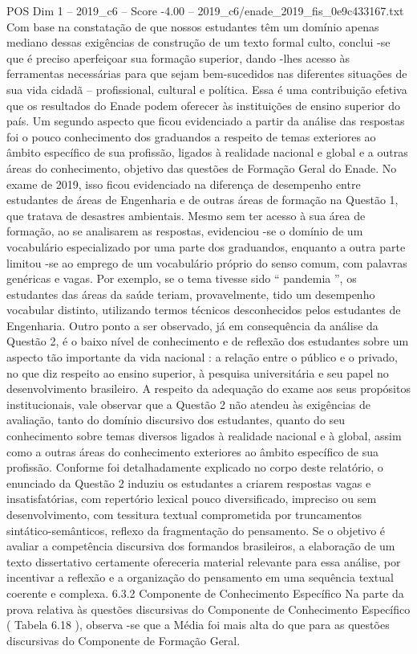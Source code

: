 \begin{textsample}{POS Dim 1 – 2019\_c6 – Score -4.00 – 2019\_c6/enade\_2019\_fis\_0e9c433167.txt}
Com base na constatação de que nossos estudantes têm um domínio apenas mediano dessas exigências de construção de um texto formal culto, conclui -se que é preciso aperfeiçoar sua formação superior, dando -lhes acesso às ferramentas necessárias para que sejam bem-sucedidos nas diferentes situações de sua vida cidadã – profissional, cultural e política.
Essa é uma contribuição efetiva que os resultados do Enade podem oferecer às instituições de ensino superior do país.
Um segundo aspecto que ficou evidenciado a partir da análise das respostas foi o pouco conhecimento dos graduandos a respeito de temas exteriores ao âmbito específico de sua profissão, ligados à realidade nacional e global e a outras áreas do conhecimento, objetivo das questões de Formação Geral do Enade.
No exame de 2019, isso ficou evidenciado na diferença de desempenho entre estudantes de áreas de Engenharia e de outras áreas de formação na Questão 1, que tratava de desastres ambientais.
Mesmo sem ter acesso à sua área de formação, ao se analisarem as respostas, evidenciou -se o domínio de um vocabulário especializado por uma parte dos graduandos, enquanto a outra parte limitou -se ao emprego de um vocabulário próprio do senso comum, com palavras genéricas e vagas.
Por exemplo, se o tema tivesse sido “ pandemia ”, os estudantes das áreas da saúde teriam, provavelmente, tido um desempenho vocabular distinto, utilizando termos técnicos desconhecidos pelos estudantes de Engenharia.
Outro ponto a ser observado, já em consequência da análise da Questão 2, é o baixo nível de conhecimento e de reflexão dos estudantes sobre um aspecto tão importante da vida nacional : a relação entre o público e o privado, no que diz respeito ao ensino superior, à pesquisa universitária e seu papel no desenvolvimento brasileiro.
A respeito da adequação do exame aos seus propósitos institucionais, vale observar que a Questão 2 não atendeu às exigências de avaliação, tanto do domínio discursivo dos estudantes, quanto do seu conhecimento sobre temas diversos ligados à realidade nacional e à global, assim como a outras áreas do conhecimento exteriores ao âmbito específico de sua profissão.
Conforme foi detalhadamente explicado no corpo deste relatório, o enunciado da Questão 2 induziu os estudantes a criarem respostas vagas e insatisfatórias, com repertório lexical pouco diversificado, impreciso ou sem desenvolvimento, com tessitura textual comprometida por truncamentos sintático-semânticos, reflexo da fragmentação do pensamento.
Se o objetivo é avaliar a competência discursiva dos formandos brasileiros, a elaboração de um texto dissertativo certamente ofereceria material relevante para essa análise, por incentivar a reflexão e a organização do pensamento em uma sequência textual coerente e complexa. 6.3.2 Componente de Conhecimento Específico Na parte da prova relativa às questões discursivas do Componente de Conhecimento Específico ( Tabela 6.18 ), observa -se que a Média foi mais alta do que para as questões discursivas do Componente de Formação Geral.

\end{textsample}
